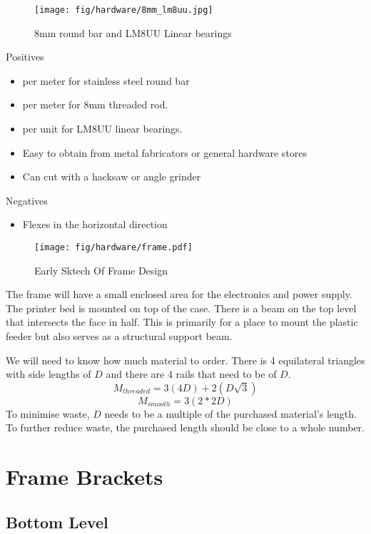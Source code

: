 \documentclass[a4paper, 11pt, twoside]{Thesis}  %
\begin{document}
\begin{figure}[H]
\centering%
\texttt{[image: fig/hardware/8mm\_lm8uu.jpg]}
\caption{8mm round bar and LM8UU Linear bearings}
\label{fig:8mm_lm8uu.jpg}
\end{figure}Positives
\begin{itemize}
\item  {} per meter for stainless steel round bar
\item  {} per meter for 8mm threaded rod.
\item  {} per unit for LM8UU linear bearings.
\item  Easy to obtain from metal fabricators or general hardware stores
\item  Can cut with a hacksaw or angle grinder
\end{itemize}

Negatives
\begin{itemize}
\item  Flexes in the horizontal direction
\end{itemize}


\begin{figure}[H]
\centering%
\texttt{[image: fig/hardware/frame.pdf]}
\caption{Early Sktech Of Frame Design}
\label{fig:frame.svg}
\end{figure}
The frame will have a small enclosed area for the electronics and power supply. The printer bed is mounted on top of the case. There is a beam on the top level that intersects the face in half. This is primarily for a place to mount the plastic feeder but also serves as a structural support beam.

We will need to know how much material to order. There is 4 equilateral triangles with side lengths of $D$  and there are 4 rails that need to be of $D$. 
$$M_{threaded} = 3(4D) + 2(D\sqrt{3}) $$
$$M_{smooth} = 3(2*2D)  $$
To minimise waste, $D$ needs to be a multiple of the purchased material's length.  To further reduce waste, the purchased length should be close to a whole number.



\section{Frame Brackets}

\subsection{Bottom Level}
\end{document}
